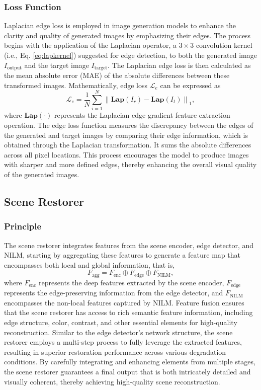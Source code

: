 \documentclass[final,12pt]{elsarticle}
\begin{document}
\subsubsection{Loss Function}
%
    Laplacian edge loss is employed in image generation models to enhance the clarity and quality of generated images by emphasizing their edges. The process begins with the application of the Laplacian operator, a $3 \times 3$ convolution kernel (i.e., Eq. \ref{eq:lapkernel}) suggested for edge detection, to both the generated image $I_{\text{output}}$ and the target image $I_{\text{target}}$. The Laplacian edge loss is then calculated as the mean absolute error (MAE) of the absolute differences between these transformed images. Mathematically, edge loss $\mathcal{L}_{e}$ can be expressed as
    \begin{equation}  
        \mathcal{L}_{e} = \frac{1}{N} \sum_{i=1}^{N}  \left\| \textbf{Lap}(I_r) - \textbf{Lap}(I_t) \right\|_1,
    \end{equation}  
    where $\textbf{Lap}(\cdot)$ represents the Laplacian edge gradient feature extraction operation. The edge loss function measures the discrepancy between the edges of the generated and target images by comparing their edge information, which is obtained through the Laplacian transformation. It sums the absolute differences across all pixel locations. This process encourages the model to produce images with sharper and more defined edges, thereby enhancing the overall visual quality of the generated images.

\subsection{Scene Restorer}
%
\subsubsection{Principle}
%

    The scene restorer integrates features from the scene encoder, edge detector, and NILM, starting by aggregating these features to generate a feature map that encompasses both local and global information, that is,
    \begin{equation}  
       F_{\text{agg}} = F_{\text{enc}} \oplus F_{\text{edge}} \oplus F_{\text{NILM}},
    \end{equation}   
    where $F_{\text{enc}}$ represents the deep features extracted by the scene encoder, $F_{\text{edge}}$ represents the edge-preserving information from the edge detector, and $F_{\text{NILM}}$ encompasses the non-local features captured by NILM. Feature fusion ensures that the scene restorer has access to rich semantic feature information, including edge structure, color, contrast, and other essential elements for high-quality reconstruction. Similar to the edge detector's network structure, the scene restorer employs a multi-step process to fully leverage the extracted features, resulting in superior restoration performance across various degradation conditions. By carefully integrating and enhancing elements from multiple stages, the scene restorer guarantees a final output that is both intricately detailed and visually coherent, thereby achieving high-quality scene reconstruction.
%
\end{document}
